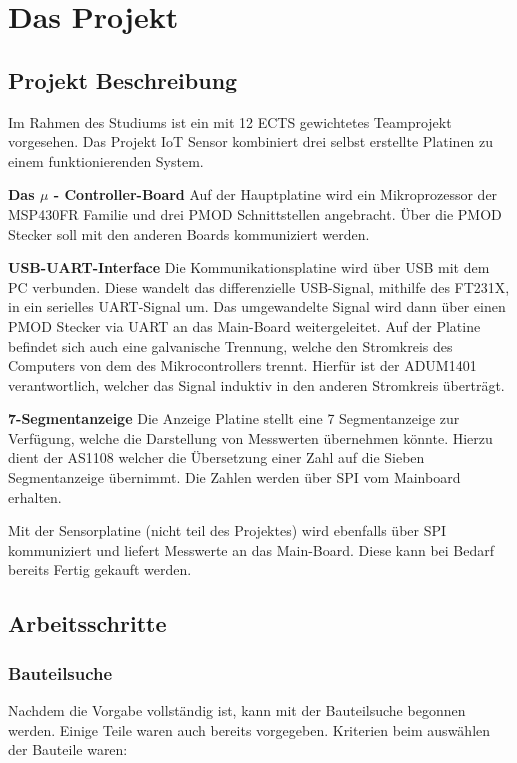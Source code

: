 %
\chapter{Das Projekt}
\label{chap:beschreibung}

\section{Projekt Beschreibung}
Im Rahmen des Studiums ist ein mit 12 ECTS gewichtetes Teamprojekt vorgesehen.
Das Projekt IoT Sensor kombiniert drei selbst erstellte Platinen zu einem funktionierenden System.

\textbf{Das $\mu$ - Controller-Board }
\newline
Auf der Hauptplatine wird ein Mikroprozessor der MSP430FR Familie und drei PMOD Schnittstellen angebracht. Über die PMOD Stecker soll mit den anderen Boards kommuniziert werden.
\newline

\textbf{ USB-UART-Interface}
\newline
Die Kommunikationsplatine wird über USB mit dem PC verbunden. Diese wandelt das differenzielle USB-Signal, mithilfe des FT231X, in ein serielles UART-Signal um. Das umgewandelte Signal wird dann über einen PMOD Stecker via UART an das Main-Board weitergeleitet. Auf der Platine befindet sich auch eine galvanische Trennung, welche den Stromkreis des Computers von dem des Mikrocontrollers trennt. Hierfür ist der ADUM1401 verantwortlich, welcher das Signal induktiv in den anderen Stromkreis überträgt.
\newline

\textbf{ 7-Segmentanzeige }
\newline
Die Anzeige Platine stellt eine 7 Segmentanzeige zur Verfügung, welche die Darstellung von Messwerten übernehmen könnte. Hierzu dient der AS1108 welcher die Übersetzung einer Zahl auf die Sieben Segmentanzeige übernimmt. Die Zahlen werden über SPI vom Mainboard erhalten.

Mit der Sensorplatine (nicht teil des Projektes) wird ebenfalls über SPI kommuniziert und liefert Messwerte an das Main-Board. Diese kann bei Bedarf bereits Fertig gekauft werden.

\section{Arbeitsschritte}

\subsection{Bauteilsuche}
Nachdem die Vorgabe vollständig ist, kann mit der Bauteilsuche begonnen werden. Einige Teile waren auch bereits vorgegeben. Kriterien beim auswählen der Bauteile waren:

